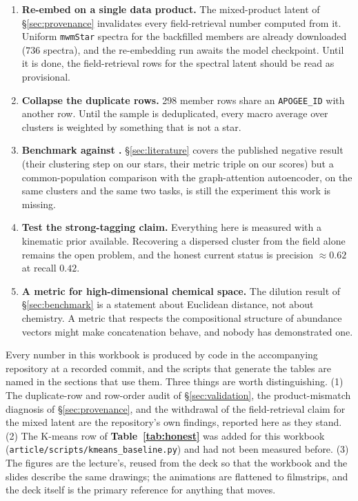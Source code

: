 \begin{issues}
\begin{enumerate}
\item \textbf{Re-embed on a single data product.} The mixed-product latent of
  \S\ref{sec:provenance} invalidates every field-retrieval number computed from
  it. Uniform \texttt{mwmStar} spectra for the backfilled members are already
  downloaded ($736$ spectra), and the re-embedding run awaits the model
  checkpoint. Until it is done, the field-retrieval rows for the spectral
  latent should be read as provisional.
\item \textbf{Collapse the duplicate rows.} 298 member rows share an
  \texttt{APOGEE\_ID} with another row. Until the sample is deduplicated, every
  macro average over clusters is weighted by something that is not a star.
\item \textbf{Benchmark against \citet{Spina:25}.} \S\ref{sec:literature}
covers the published negative result (their clustering step on our stars, their
metric triple on our scores) but a common-population comparison with the
graph-attention autoencoder, on the same clusters and the same two tasks, is
still the experiment this work is missing.
\item \textbf{Test the strong-tagging claim.} Everything here is measured with
  a kinematic prior available. Recovering a dispersed cluster from the field
  alone remains the open problem, and the honest current status is
  precision $\approx 0.62$ at recall $0.42$.
\item \textbf{A metric for high-dimensional chemical space.} The dilution
  result of \S\ref{sec:benchmark} is a statement about Euclidean distance, not
  about chemistry. A metric that respects the compositional structure of
  abundance vectors might make concatenation behave, and nobody has
  demonstrated one.
\end{enumerate}
\end{issues}

\begin{issues}
Every number in this workbook is produced by code in the accompanying
repository at a recorded commit, and the scripts that generate the tables are
named in the sections that use them. Three things are worth distinguishing.
(1) The duplicate-row and row-order audit of \S\ref{sec:validation}, the
product-mismatch diagnosis of \S\ref{sec:provenance}, and the withdrawal of
the field-retrieval claim for the mixed latent are the repository's own
findings, reported here as they stand. (2) The K-means row of
\textbf{Table~\ref{tab:honest}} was added for this workbook
(\texttt{article/scripts/kmeans\_baseline.py}) and had not been measured
before. (3) The figures are the lecture's, reused from the deck so that the
workbook and the slides describe the same drawings; the animations are
flattened to filmstrips, and the deck itself is the primary reference for
anything that moves.
\end{issues}

